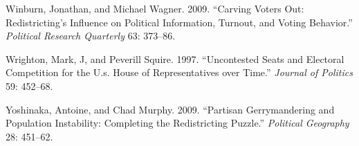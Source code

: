 \documentclass[
  12pt,
]{article}
\newlength{\cslhangindent}
\newenvironment{cslreferences}%
  {\setlength{\parindent}{0pt}%
  \everypar{\setlength{\hangindent}{\cslhangindent}}\ignorespaces}%
  {\par}
\begin{document}
\begin{cslreferences}
\leavevmode\hypertarget{ref-Winburn2009}{}%
Winburn, Jonathan, and Michael Wagner. 2009. ``Carving Voters Out: Redistricting's Influence on Political Information, Turnout, and Voting Behavior.'' \emph{Political Research Quarterly} 63: 373--86.

\leavevmode\hypertarget{ref-Wrighton1997}{}%
Wrighton, Mark, J, and Peverill Squire. 1997. ``Uncontested Seats and Electoral Competition for the U.s. House of Representatives over Time.'' \emph{Journal of Politics} 59: 452--68.

\leavevmode\hypertarget{ref-Yoshinaka2009}{}%
Yoshinaka, Antoine, and Chad Murphy. 2009. ``Partisan Gerrymandering and Population Instability: Completing the Redistricting Puzzle.'' \emph{Political Geography} 28: 451--62.
\end{cslreferences}
\end{document}
